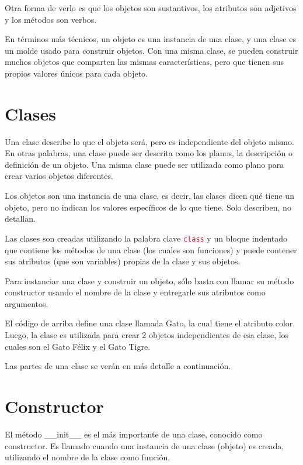 \documentclass{report}
\newcommand{\ttt}[1]{\textcolor{Crimson}{\texttt{#1}}}
\begin{document}
Otra forma de verlo es que los objetos son sustantivos, los atributos son adjetivos y los métodos son verbos.\smallskip

En términos más técnicos, un objeto es una instancia de una clase, y una clase es un molde usado para construir objetos. Con una misma clase, se pueden construir muchos objetos que comparten las mismas características, pero que tienen sus propios valores únicos para cada objeto.

\section{Clases}


Una clase describe lo que el objeto será, pero es independiente del objeto mismo. En otras palabras, una clase puede ser descrita como los planos, la descripción o definición de un objeto. Una misma clase puede ser utilizada como plano para crear varios objetos diferentes.\smallskip

Los objetos son una instancia de una clase, es decir, las clases dicen qué tiene un objeto, pero no indican los valores específicos de lo que tiene. Solo describen, no detallan.\smallskip

Las clases son creadas utilizando la palabra clave \ttt{class} y un bloque indentado que contiene los métodos de una clase (los cuales son funciones) y puede contener sus atributos (que son variables) propias de la clase y sus objetos.\smallskip

Para instanciar una clase y construir un objeto, sólo basta con llamar su método constructor usando el nombre de la clase y entregarle sus atributos como argumentos.


El código de arriba define una clase llamada Gato, la cual tiene el atributo color. Luego, la clase es utilizada para crear 2 objetos independientes de esa clase, los cuales son el Gato Félix y el Gato Tigre.\smallskip

Las partes de una clase se verán en más detalle a continuación.

\section{Constructor}

El método \_\_init\_\_ es el más importante de una clase, conocido como constructor. Es llamado cuando una instancia de una clase (objeto) es creada, utilizando el nombre de la clase como función.\smallskip
\end{document}
